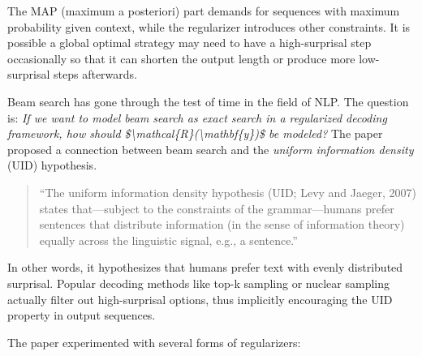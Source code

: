 The MAP (maximum a posteriori) part demands for sequences with maximum probability given context, while the regularizer introduces other constraints. It is possible a global optimal strategy may need to have a high-surprisal step occasionally so that it can shorten the output length or produce more low-surprisal steps afterwards.

Beam search has gone through the test of time in the field of NLP. The question is: \emph{If we want to model beam search as exact search in a regularized decoding framework, how should \$\textbackslash mathcal\{R\}(\textbackslash mathbf\{y\})\$ be modeled?} The paper proposed a connection between beam search and the \emph{uniform information density} (UID) hypothesis.

\begin{quote}
``The uniform information density hypothesis (UID; Levy and Jaeger, 2007) states that---subject to the constraints of the grammar---humans prefer sentences that distribute information (in the sense of information theory) equally across the linguistic signal, e.g., a sentence.''
\end{quote}

In other words, it hypothesizes that humans prefer text with evenly distributed surprisal. Popular decoding methods like top-k sampling or nuclear sampling actually filter out high-surprisal options, thus implicitly encouraging the UID property in output sequences.

The paper experimented with several forms of regularizers:

